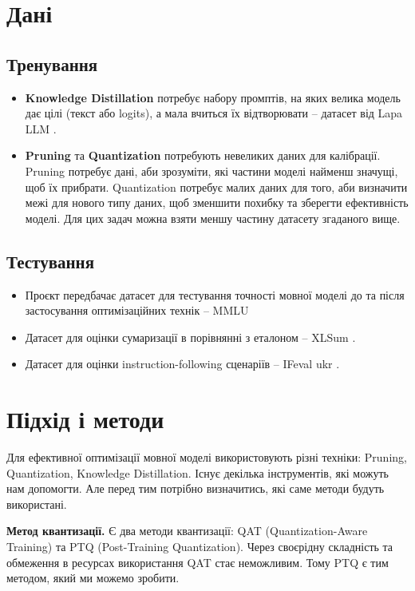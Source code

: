 \documentclass[ukrainian]{ucuproposal}
\begin{document}
\section{Дані}
\subsection{Тренування}
\begin{itemize}
    \item \textbf{Knowledge Distillation} потребує набору промптів, на яких велика модель дає цілі (текст або logits), а мала вчиться їх відтворювати -- датасет від Lapa LLM \cite{dataset_wiki_instr}.
    \item \textbf{Pruning} та \textbf{Quantization} потребують невеликих даних для калібрації. Pruning потребує дані, аби зрозуміти, які частини моделі найменш значущі, щоб їх прибрати. Quantization потребує малих даних для того, аби визначити межі для нового типу даних, щоб зменшити похибку та зберегти ефективність моделі. Для цих задач можна взяти меншу частину датасету згаданого вище.
\end{itemize}

\subsection{Тестування}
\begin{itemize}
    \item Проєкт передбачає датасет для тестування точності мовної моделі до та після застосування оптимізаційних технік -- MMLU \cite{dataset_mmlu}
    \item Датасет для оцінки сумаризації в порівнянні з еталоном -- XLSum \cite{xlsum}.
    \item Датасет для оцінки instruction-following сценаріїв -- IFeval ukr \cite{dataset_ifeval}. 
\end{itemize}

\section{Підхід і методи}
Для ефективної оптимізації мовної моделі використовують різні техніки: Pruning, Quantization, Knowledge Distillation. Існує декілька інструментів, які можуть нам допомогти. Але перед тим потрібно визначитись, які саме методи будуть використані.

\textbf{Метод квантизації.} Є два методи квантизації: QAT (Quantization-Aware Training) та PTQ (Post-Training Quantization). Через своєрідну складність та обмеження в ресурсах використання QAT стає неможливим. Тому PTQ є тим методом, який ми можемо зробити.
\end{document}
